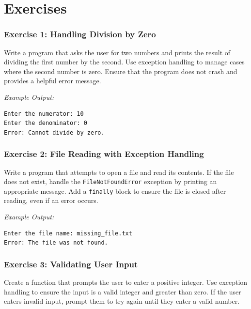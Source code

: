 \documentclass[
  letterpaper,
  DIV=11,
  numbers=noendperiod]{scrreprt}
\begin{document}
\hypertarget{exercises-13}{%
\section{Exercises}\label{exercises-13}}

\hypertarget{exercise-1-handling-division-by-zero}{%
\subsubsection{Exercise 1: Handling Division by
Zero}\label{exercise-1-handling-division-by-zero}}

Write a program that asks the user for two numbers and prints the result
of dividing the first number by the second. Use exception handling to
manage cases where the second number is zero. Ensure that the program
does not crash and provides a helpful error message.

\emph{Example Output:}

\begin{verbatim}
Enter the numerator: 10
Enter the denominator: 0
Error: Cannot divide by zero.
\end{verbatim}

\hypertarget{exercise-2-file-reading-with-exception-handling}{%
\subsubsection{Exercise 2: File Reading with Exception
Handling}\label{exercise-2-file-reading-with-exception-handling}}

Write a program that attempts to open a file and read its contents. If
the file does not exist, handle the \texttt{FileNotFoundError} exception
by printing an appropriate message. Add a \texttt{finally} block to
ensure the file is closed after reading, even if an error occurs.

\emph{Example Output:}

\begin{verbatim}
Enter the file name: missing_file.txt
Error: The file was not found.
\end{verbatim}

\hypertarget{exercise-3-validating-user-input}{%
\subsubsection{Exercise 3: Validating User
Input}\label{exercise-3-validating-user-input}}

Create a function that prompts the user to enter a positive integer. Use
exception handling to ensure the input is a valid integer and greater
than zero. If the user enters invalid input, prompt them to try again
until they enter a valid number.
\end{document}
